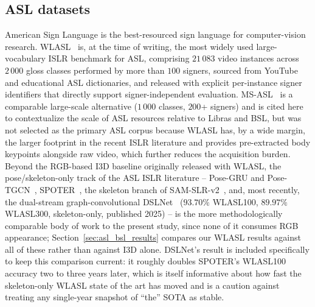 \documentclass[journal]{IEEEtran}
\begin{document}
\subsection{ASL datasets}
American Sign Language is the best-resourced sign language for computer-vision research. WLASL~\cite{wlasl2020} is, at the time of writing, the most widely used large-vocabulary ISLR benchmark for ASL, comprising $21\,083$ video instances across $2\,000$ gloss classes performed by more than $100$ signers, sourced from YouTube and educational ASL dictionaries, and released with explicit per-instance signer identifiers that directly support signer-independent evaluation. MS-ASL~\cite{joze2019msasl} is a comparable large-scale alternative ($1\,000$ classes, $200$+ signers) and is cited here to contextualize the scale of ASL resources relative to Libras and BSL, but was not selected as the primary ASL corpus because WLASL has, by a wide margin, the larger footprint in the recent ISLR literature and provides pre-extracted body keypoints alongside raw video, which further reduces the acquisition burden. Beyond the RGB-based I3D baseline originally released with WLASL, the pose/skeleton-only track of the ASL ISLR literature -- Pose-GRU and Pose-TGCN~\cite{wlasl2020}, SPOTER~\cite{bohacek2022spoter,bohacek2022mediapipe}, the skeleton branch of SAM-SLR-v2~\cite{jiang2021samslr}, and, most recently, the dual-stream graph-convolutional DSLNet~\cite{liu2025dslnet} ($93.70\%$ WLASL100, $89.97\%$ WLASL300, skeleton-only, published 2025) -- is the more methodologically comparable body of work to the present study, since none of it consumes RGB appearance; Section~\ref{sec:asl_bsl_results} compares our WLASL results against all of these rather than against I3D alone. DSLNet's result is included specifically to keep this comparison current: it roughly doubles SPOTER's WLASL100 accuracy two to three years later, which is itself informative about how fast the skeleton-only WLASL state of the art has moved and is a caution against treating any single-year snapshot of ``the'' SOTA as stable.
\end{document}
